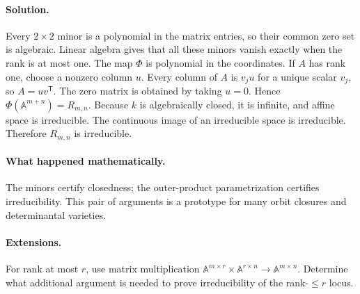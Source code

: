 \paragraph{Solution.}
Every \(2\times2\) minor is a polynomial in the matrix entries, so their common zero set is
algebraic.  Linear algebra gives that all these minors vanish exactly when the rank is at
most one.
The map \(\Phi\) is polynomial in the coordinates.  If \(A\) has rank one, choose a
nonzero column \(u\).  Every column of \(A\) is \(v_j u\) for a unique scalar \(v_j\), so
\(A=uv^{\mathsf T}\).  The zero matrix is obtained by taking \(u=0\).  Hence
\(\Phi(\mathbb A^{m+n})=R_{m,n}\).
Because \(k\) is algebraically closed, it is infinite, and affine space is irreducible.
The continuous image of an irreducible space is irreducible.  Therefore \(R_{m,n}\) is
irreducible.
\paragraph{What happened mathematically.}
The minors certify closedness; the outer-product parametrization certifies irreducibility.
This pair of arguments is a prototype for many orbit closures and determinantal varieties.
\paragraph{Extensions.}
For rank at most \(r\), use matrix multiplication
\(\mathbb A^{m\times r}\times\mathbb A^{r\times n}\to\mathbb A^{m\times n}\).  Determine
what additional argument is needed to prove irreducibility of the rank-\(\le r\) locus.
\fi
